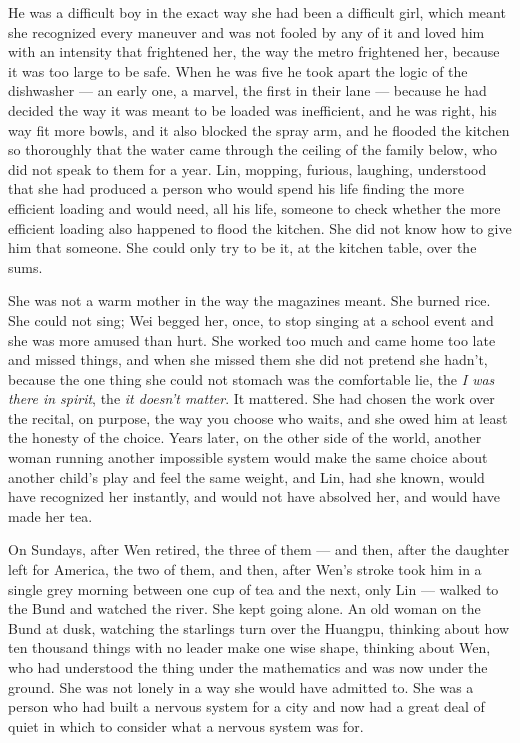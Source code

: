He was a difficult boy in the exact way she had been a difficult girl, which meant she recognized every maneuver and was not fooled by any of it and loved him with an intensity that frightened her, the way the metro frightened her, because it was too large to be safe. When he was five he took apart the logic of the dishwasher --- an early one, a marvel, the first in their lane --- because he had decided the way it was meant to be loaded was inefficient, and he was right, his way fit more bowls, and it also blocked the spray arm, and he flooded the kitchen so thoroughly that the water came through the ceiling of the family below, who did not speak to them for a year. Lin, mopping, furious, laughing, understood that she had produced a person who would spend his life finding the more efficient loading and would need, all his life, someone to check whether the more efficient loading also happened to flood the kitchen. She did not know how to give him that someone. She could only try to be it, at the kitchen table, over the sums.

She was not a warm mother in the way the magazines meant. She burned rice. She could not sing; Wei begged her, once, to stop singing at a school event and she was more amused than hurt. She worked too much and came home too late and missed things, and when she missed them she did not pretend she hadn't, because the one thing she could not stomach was the comfortable lie, the \emph{I was there in spirit}, the \emph{it doesn't matter}. It mattered. She had chosen the work over the recital, on purpose, the way you choose who waits, and she owed him at least the honesty of the choice. Years later, on the other side of the world, another woman running another impossible system would make the same choice about another child's play and feel the same weight, and Lin, had she known, would have recognized her instantly, and would not have absolved her, and would have made her tea.

On Sundays, after Wen retired, the three of them --- and then, after the daughter left for America, the two of them, and then, after Wen's stroke took him in a single grey morning between one cup of tea and the next, only Lin --- walked to the Bund and watched the river. She kept going alone. An old woman on the Bund at dusk, watching the starlings turn over the Huangpu, thinking about how ten thousand things with no leader make one wise shape, thinking about Wen, who had understood the thing under the mathematics and was now under the ground. She was not lonely in a way she would have admitted to. She was a person who had built a nervous system for a city and now had a great deal of quiet in which to consider what a nervous system was for.

